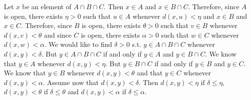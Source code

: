 \documentclass[a4paper,twoside,12pt]{article} %
\makeatletter
\DeclareRobustCommand{\_}{%
  \leavevmode\vbox{%
    \hrule\@width.4em
          \@height-.16ex
          \@depth\dimexpr.16ex+.28pt\relax}}
\makeatother
\begin{document}
\begin{center}
\begin{minipage}{120mm}
Let $x$ be an element of $A\cap B\cap C$. Then $x\in A$ and $x\in B\cap C$. Therefore, since $A$ is open, there exists $\eta > 0$ such that $u\in A$\textrm{ whenever }$\textit{d}(x,u) < \eta$ and $x\in B$ and $x\in C$. Therefore, since $B$ is open, there exists $\theta > 0$ such that $v\in B$\textrm{ whenever }$\textit{d}(x,v) < \theta$ and since $C$ is open, there exists $\alpha > 0$ such that $w\in C$\textrm{ whenever }$\textit{d}(x,w) < \alpha$. We would like to find $\delta > 0$ s.t. $y\in A\cap B\cap C$\textrm{ whenever }$\textit{d}(x,y) < \delta$. But $y\in A\cap B\cap C$ if and only if $y\in A$ and $y\in B\cap C$. We know that $y\in A$ whenever $\textit{d}(x,y) < \eta$. But $y\in B\cap C$ if and only if $y\in B$ and $y\in C$. We know that $y\in B$ whenever $\textit{d}(x,y) < \theta$ and that $y\in C$ whenever $\textit{d}(x,y) < \alpha$. Assume now that $\textit{d}(x,y) < \delta$. Then $\textit{d}(x,y) < \eta$ if $\delta\leqslant \eta$, $\textit{d}(x,y) < \theta$ if $\delta\leqslant \theta$ and $\textit{d}(x,y) < \alpha$ if $\delta\leqslant \alpha$.
\end{minipage}
\end{center}
\end{document}
